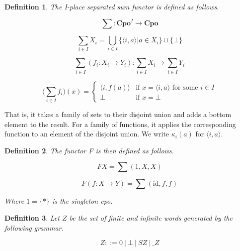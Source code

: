 \documentclass[a4paper]{article}
\newcommand{\arr}{\rightarrow}
\newtheorem{defNuF}{Definition}[section]
\newtheorem{defNplaceSeparatedSum}[defNuF]{Definition}
\newtheorem{defF}[defNuF]{Definition}
\begin{document}
\begin{defNplaceSeparatedSum}

The I-place separated sum functor is defined as follows.

\begin{equation}
\sum : \mathbf{Cpo}^I \arr \mathbf{Cpo} \nonumber
\end{equation}

\begin{equation}
\sum_{i \in I}{X_i} =
  \bigcup_{i \in I} \{ \langle i, a \rangle | a \in X_i \}
  \cup \{ \bot \} \nonumber
\end{equation}

\begin{equation}
\sum_{i \in I}{(f_i : X_i \arr Y_i)} :
  \sum_{i \in I}{X_i} \arr \sum_{i \in I}{Y_i}
\end{equation}

\begin{equation*}
(\sum_{i \in I}{f_i)(x)} = \left\{
  \begin{array}{rl}
     \langle i, f(a) \rangle & \text{if } x = \langle i, a \rangle
                               \text{ for some } i \in I \\
    \bot                     & \text{if } x = \bot
  \end{array} \right.
\end{equation*}

\end{defNplaceSeparatedSum}

That is, it takes a family of sets to their disjoint union and adds a bottom
element to the result.  For a family of functions, it applies the corresponding
function to an element of the disjoint union.  We write $\kappa_i(a)$ for
$\langle i, a \rangle$.

\begin{defF}

The functor F is then defined as follows.

\begin{equation*}
FX = \sum{(1, X, X)}
\end{equation*}

\begin{equation*}
F(f : X \arr Y) = \sum{(\text{id}, f, f)}
\end{equation*}

Where $1 = \{*\}$ is the singleton cpo.

\end{defF}


\begin{defNuF}

Let $Z$ be the set of finite and infinite words generated by the following
grammar.

\begin{equation*}
Z ::= 0 \ |\ \bot \ |\ S Z \ |\ \_ Z
\end{equation*}

\end{defNuF}
\end{document}
